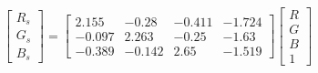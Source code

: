 \begin{equation}
\begin{bmatrix}
  R_s \\ G_s \\ B_s 
\end{bmatrix}=
\left[\begin{matrix}2.155 & -0.28 & -0.411 & -1.724\\ 
-0.097 & 2.263 & -0.25 & -1.63\\ 
-0.389 & -0.142 & 2.65 & -1.519\end{matrix}\right]
\begin{bmatrix}
  R \\ G \\ B \\ 1 
\end{bmatrix}
\end{equation}
